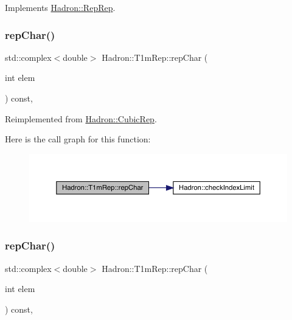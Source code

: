 Implements \mbox{\hyperlink{structHadron_1_1RepRep_ab3213025f6de249f7095892109575fde}{Hadron\+::\+Rep\+Rep}}.

\mbox{\label{structHadron_1_1T1mRep_a3605cd47c3e2c6eb4d6982fafa0a1b89}} 
\subsubsection{\texorpdfstring{repChar()}{repChar()}\hspace{0.1cm}{\footnotesize\ttfamily [1/3]}}
{\footnotesize\ttfamily std\+::complex$<$double$>$ Hadron\+::\+T1m\+Rep\+::rep\+Char (\begin{DoxyParamCaption}\item[{int}]{elem }\end{DoxyParamCaption}) const\hspace{0.3cm}{\ttfamily [inline]}, {\ttfamily [virtual]}}



Reimplemented from \mbox{\hyperlink{structHadron_1_1CubicRep_af45227106e8e715e84b0af69cd3b36f8}{Hadron\+::\+Cubic\+Rep}}.

Here is the call graph for this function\+:
\nopagebreak
\begin{figure}[H]
\begin{center}
\leavevmode
\includegraphics[width=350pt]{de/dd9/structHadron_1_1T1mRep_a3605cd47c3e2c6eb4d6982fafa0a1b89_cgraph}
\end{center}
\end{figure}
\mbox{\label{structHadron_1_1T1mRep_a3605cd47c3e2c6eb4d6982fafa0a1b89}} 
\subsubsection{\texorpdfstring{repChar()}{repChar()}\hspace{0.1cm}{\footnotesize\ttfamily [2/3]}}
{\footnotesize\ttfamily std\+::complex$<$double$>$ Hadron\+::\+T1m\+Rep\+::rep\+Char (\begin{DoxyParamCaption}\item[{int}]{elem }\end{DoxyParamCaption}) const\hspace{0.3cm}{\ttfamily [inline]}, {\ttfamily [virtual]}}



